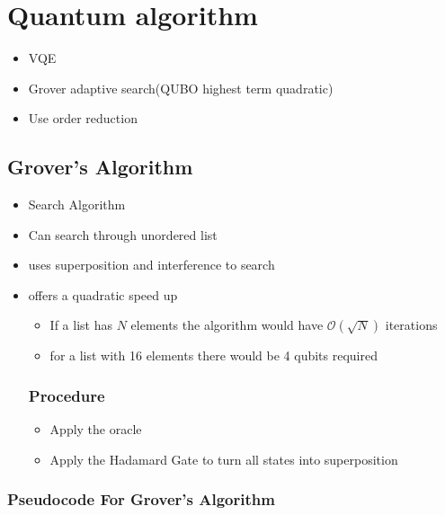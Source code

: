 \documentclass{Assignment}
\begin{document}
\section*{Quantum algorithm}

\begin{itemize}
	\item VQE
	\item Grover adaptive search(QUBO highest term quadratic)
	\item Use order reduction
\end{itemize}
\subsection*{Grover's Algorithm}
\begin{itemize}
\item Search Algorithm 
\item Can search through unordered list
\item uses superposition and interference to search
\item offers a quadratic speed up 
\begin{itemize}
\item If a list has $N$ elements the algorithm would have $\mathcal{O}(\sqrt{N})$ iterations
\item for a list with 16 elements there would be 4 qubits required
\end{itemize}
\subsubsection*{Procedure}
\begin{itemize}
	\item Apply the oracle
	\item Apply the Hadamard Gate to turn all states into superposition
\end{itemize}
\end{itemize}
\subsubsection*{Pseudocode For Grover's Algorithm}
\end{document}
